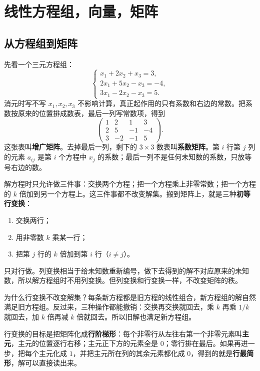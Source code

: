 \section{线性方程组，向量，矩阵}

\subsection{从方程组到矩阵}

先看一个三元方程组：
\[
\begin{cases}
x_1+2x_2+x_3=3,\\
2x_1+5x_2-x_3=-4,\\
3x_1-2x_2-x_3=5.
\end{cases}
\]
消元时写不写 \(x_1,x_2,x_3\) 不影响计算，真正起作用的只有系数和右边的常数。把系数按原来的位置排成数表，最后一列写常数项，得到
\[
\left(\begin{array}{ccc|c}
1 & 2 & 1 & 3\\
2 & 5 & -1 & -4\\
3 & -2 & -1 & 5
\end{array}\right).
\]
这张表叫\textbf{增广矩阵}。去掉最后一列，剩下的 \(3\times 3\) 数表叫\textbf{系数矩阵}。第 \(i\) 行第 \(j\) 列的元素 \(a_{ij}\) 是第 \(i\) 个方程中 \(x_j\) 的系数；最后一列不是任何未知数的系数，只放等号右边的数。

解方程时只允许做三件事：交换两个方程；把一个方程乘上非零常数；把一个方程的 \(k\) 倍加到另一个方程上。这三件事都不改变解集。搬到矩阵上，就是三种\textbf{初等行变换}：
\begin{enumerate}
\item 交换两行；
\item 用非零数 \(k\) 乘某一行；
\item 把第 \(j\) 行的 \(k\) 倍加到第 \(i\) 行（\(i\ne j\)）。
\end{enumerate}
只对行做。列变换相当于给未知数重新编号，做下去得到的解不对应原来的未知数，所以解方程组时不用列变换。但列变换和行变换一样，不改变矩阵的秩。

为什么行变换不改变解集？每条新方程都是旧方程的线性组合，新方程组的解自然满足旧方程组。反过来，三种操作都能撤销：交换再交换就回去，乘 \(k\) 再乘 \(1/k\) 就回去，加 \(k\) 倍再减 \(k\) 倍就回去。所以旧解也满足新方程组。

行变换的目标是把矩阵化成\textbf{行阶梯形}：每个非零行从左往右第一个非零元素叫\textbf{主元}，主元的位置逐行右移；主元正下方的元素全是 \(0\)；零行排在最后。如果再进一步，把每个主元化成 \(1\)，并把主元所在列的其余元素都化成 \(0\)，得到的就是\textbf{行最简形}，解可以直接读出来。

